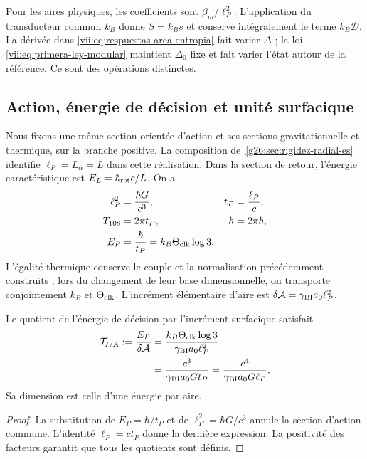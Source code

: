 Pour les aires physiques, les coefficients sont \(\beta_m/\ell_P^2\). L'application du transducteur commun \(k_B\) donne \(S=k_Bs\) et conserve intégralement le terme \(k_B\mathcal D\). La dérivée dans \eqref{vii:eq:respuestas-area-entropia} fait varier \(\Delta\) ; la loi \eqref{vii:eq:primera-ley-modular} maintient \(\Delta_0\) fixe et fait varier l'état autour de la référence. Ce sont des opérations distinctes.

\subsection{Action, énergie de décision et unité surfacique}
\label{vii:subsec:conversion-informacion-area}

Nous fixons une même section orientée d'action et ses sections gravitationnelle
et thermique, sur la branche positive. La composition
de~\ref{g26:sec:rigidez-radial-es} identifie
\(\ell_P=L_\alpha=L\) dans cette réalisation. Dans la section de retour,
l'énergie caractéristique est \(E_L=\hbar_{\rm ret}c/L\). On a
\begin{equation}
 \begin{aligned}
 \ell_P^2&=\frac{\hbar G}{c^3},& t_P&=\frac{\ell_P}{c},\\
 T_{108}&=2\pi t_P,& h&=2\pi\hbar,\\
 E_P&=\frac{\hbar}{t_P}=k_B\Theta_{\rm clk}\log3.&&
 \end{aligned}
 \label{vii:eq:unidad-accion-informacion}
\end{equation}
L'égalité thermique conserve le couple et la normalisation précédemment
construits ; lors du changement de leur base dimensionnelle, on transporte conjointement
\(k_B\) et \(\Theta_{\rm clk}\). L'incrément élémentaire d'aire est
\(\delta\mathcal A=\gamma_{\rm BI}a_0\ell_P^2\).

\begin{proposition}
\label{vii:prop:tension-informacion-area}
Le quotient de l'énergie de décision par l'incrément surfacique satisfait
\begin{equation}
 \begin{aligned}
 \mathcal T_{I/A}:=\frac{E_P}{\delta\mathcal A}
 &=\frac{k_B\Theta_{\rm clk}\log3}{\gamma_{\rm BI}a_0\ell_P^2}\\
 &=\frac{c^3}{\gamma_{\rm BI}a_0G t_P}
  =\frac{c^4}{\gamma_{\rm BI}a_0G\ell_P}.
 \end{aligned}
 \label{vii:eq:tension-informacion-area}
\end{equation}
Sa dimension est celle d'une énergie par aire.
\end{proposition}
\begin{proof}
La substitution de \(E_P=\hbar/t_P\) et de
\(\ell_P^2=\hbar G/c^3\) annule la section d'action commune.
L'identité \(\ell_P=ct_P\) donne la dernière expression. La positivité
des facteurs garantit que tous les quotients sont définis.
\end{proof}

